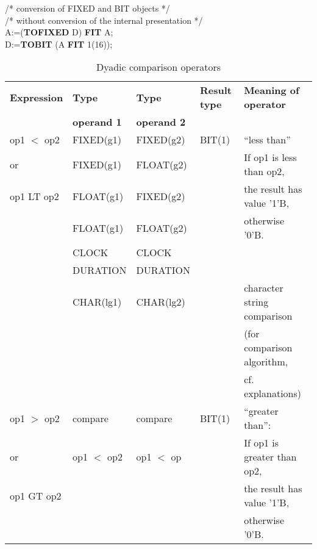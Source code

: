 /* conversion of FIXED and BIT objects */ \\
/* without conversion of the internal presentation */ \\
A:=({\bf TOFIXED} D) {\bf FIT} A;\\
D:={\bf TOBIT} (A {\bf FIT} 1(16));

\begin{table} %
\begin{center}
\caption{Dyadic comparison operators}
\label{tab76}
\vspace{5mm}
\begin{tabular}{|l|l|l|l|l|}
\hline
{\bf Expression} & {\bf Type}      & {\bf Type}      & {\bf Result type} & {\bf Meaning of operator}\\
                 & {\bf operand 1} & {\bf operand 2} &                   & \\ \hline

op1 $<$ op2      & FIXED(g1)       & FIXED(g2)       &   BIT(1)             & ``less than''\\
or               & FIXED(g1)       & FLOAT(g2)       &                      & If op1 is less than op2,\\
op1 LT op2       & FLOAT(g1)       & FIXED(g2)       &                      & the result has value '1'B,\\
                 & FLOAT(g1)       & FLOAT(g2)       &                      & otherwise '0'B.\\
                 & CLOCK           & CLOCK           &                      & \\
                 & DURATION        & DURATION        &                      & \\ \cline{2-3} \cline{5-5}
                 & CHAR(lg1)       & CHAR(lg2)       &                      & character string comparison\\
                 &                 &                 &                      & (for comparison algorithm,\\
                 &                 &                 &                      & cf. explanations)\\ \hline

op1 $>$ op2      & compare         & compare         & BIT(1)               & ``greater than'':\\
or               & op1 $<$ op2     & op1 $<$ op      &                      & If op1 is greater than op2,\\
op1 GT op2       &                 &                 &                      & the result has value '1'B,\\
                 &                 &                 &                      & otherwise '0'B.\\ \hline


\end{tabular}
\end{center}
\end{table}
